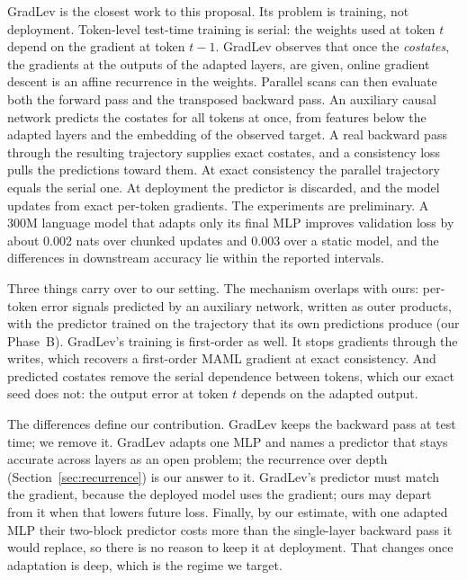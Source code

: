 \documentclass{article}
\begin{document}
GradLev \parencite{liu2026gradlev} is the closest work to this proposal. Its
problem is training, not deployment. Token-level test-time training is serial:
the weights used at token $t$ depend on the gradient at token $t-1$. GradLev
observes that once the \emph{costates}, the gradients at the outputs of the
adapted layers, are given, online gradient descent is an affine recurrence in
the weights. Parallel scans can then evaluate both the forward pass and the
transposed backward pass. An auxiliary causal network predicts the costates
for all tokens at once, from features below the adapted layers and the
embedding of the observed target. A real backward pass through the resulting
trajectory supplies exact costates, and a consistency loss pulls the
predictions toward them. At exact consistency the parallel trajectory equals
the serial one. At deployment the predictor is discarded, and the model updates
from exact per-token gradients. The experiments are preliminary. A 300M
language model that adapts only its final MLP improves validation loss by about
0.002 nats over chunked updates and 0.003 over a static model, and the
differences in downstream accuracy lie within the reported intervals.

Three things carry over to our setting. The mechanism overlaps with ours:
per-token error signals predicted by an auxiliary network, written as outer
products, with the predictor trained on the trajectory that its own predictions
produce (our Phase~B). GradLev's training is first-order as well. It stops
gradients through the writes, which recovers a first-order MAML gradient at
exact consistency. And predicted costates remove the serial dependence between
tokens, which our exact seed does not: the output error at token $t$ depends on
the adapted output.

The differences define our contribution. GradLev keeps the backward pass at
test time; we remove it. GradLev adapts one MLP and names a predictor that
stays accurate across layers as an open problem; the recurrence over depth
(Section~\ref{sec:recurrence}) is our answer to it. GradLev's predictor must
match the gradient, because the deployed model uses the gradient; ours may
depart from it when that lowers future loss. Finally, by our estimate, with one
adapted MLP their two-block predictor costs more than the single-layer backward
pass it would replace, so there is no reason to keep it at deployment. That
changes once adaptation is deep, which is the regime we target.

\end{document}
